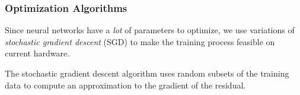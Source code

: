 \begin{frame}
    \frametitle{Optimization Algorithms}

    Since neural networks have a \textit{lot} of parameters to optimize, we use variations of \textit{stochastic 
    gradient descent} (SGD) to make the training process feasible on current hardware.

    \bigskip
    \pause

    The stochastic gradient descent algorithm uses random subsets of the training data to compute an approximation to 
    the gradient of the residual.

    \bigskip
    \pause
\end{frame}